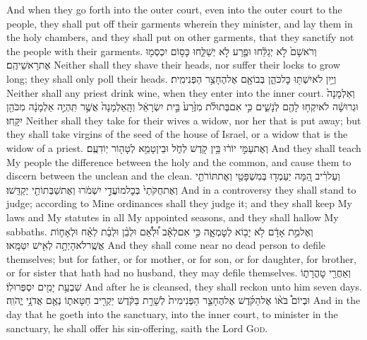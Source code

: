 {And when they go forth into the outer court, even into the outer court to the people, they shall put off their garments wherein they minister, and lay them in the holy chambers, and they shall put on other garments, that they sanctify not the people with their garments.}
{וְרֹאשָׁם֙ לֹ֣א יְגַלֵּ֔חוּ וּפֶ֖רַע לֹ֣א יְשַׁלֵּ֑חוּ כָּס֥וֹם יִכְסְמ֖וּ אֶת\maqqaf רָאשֵׁיהֶֽם׃}
{Neither shall they shave their heads, nor suffer their locks to grow long; they shall only poll their heads.}
{וְיַ֥יִן לֹא\maqqaf יִשְׁתּ֖וּ כׇּל\maqqaf כֹּהֵ֑ן בְּבוֹאָ֖ם אֶל\maqqaf הֶחָצֵ֥ר הַפְּנִימִֽית׃}
{Neither shall any priest drink wine, when they enter into the inner court.}
{וְאַלְמָנָה֙ וּגְרוּשָׁ֔ה לֹא\maqqaf יִקְח֥וּ לָהֶ֖ם לְנָשִׁ֑ים כִּ֣י אִם\maqqaf בְּתוּלֹ֗ת מִזֶּ֙רַע֙ בֵּ֣ית יִשְׂרָאֵ֔ל וְהָֽאַלְמָנָה֙ אֲשֶׁ֣ר תִּֽהְיֶ֣ה אַלְמָנָ֔ה מִכֹּהֵ֖ן יִקָּֽחוּ׃}
{Neither shall they take for their wives a widow, nor her that is put away; but they shall take virgins of the seed of the house of Israel, or a widow that is the widow of a priest.}
{וְאֶת\maqqaf עַמִּ֣י יוֹר֔וּ בֵּ֥ין קֹ֖דֶשׁ לְחֹ֑ל וּבֵין\maqqaf טָמֵ֥א לְטָה֖וֹר יֽוֹדִעֻֽם׃}
{And they shall teach My people the difference between the holy and the common, and cause them to discern between the unclean and the clean.}
{וְעַל\maqqaf רִ֗יב הֵ֚מָּה יַעַמְד֣וּ  בְּמִשְׁפָּטַ֖י  וְאֶת\maqqaf תּוֹרֹתַ֤י וְאֶת\maqqaf חֻקֹּתַי֙ בְּכׇל\maqqaf מוֹעֲדַ֣י יִשְׁמֹ֔רוּ וְאֶת\maqqaf שַׁבְּתוֹתַ֖י יְקַדֵּֽשׁוּ׃}
{And in a controversy they shall stand to judge; according to Mine ordinances shall they judge it; and they shall keep My laws and My statutes in all My appointed seasons, and they shall hallow My sabbaths.}
{וְאֶל\maqqaf מֵ֣ת אָדָ֔ם לֹ֥א יָב֖וֹא לְטׇמְאָ֑ה כִּ֣י אִם\maqqaf לְאָ֡ב וּ֠לְאֵ֠ם וּלְבֵ֨ן וּלְבַ֜ת לְאָ֗ח וּלְאָח֛וֹת אֲשֶֽׁר\maqqaf לֹא\maqqaf הָיְתָ֥ה לְאִ֖ישׁ יִטַּמָּֽאוּ׃}
{And they shall come near no dead person to defile themselves; but for father, or for mother, or for son, or for daughter, for brother, or for sister that hath had no husband, they may defile themselves.}
{וְאַחֲרֵ֖י טׇהֳרָת֑וֹ שִׁבְעַ֥ת יָמִ֖ים יִסְפְּרוּ\maqqaf לֽוֹ׃}
{And after he is cleansed, they shall reckon unto him seven days.}
{וּבְיוֹם֩ בֹּא֨וֹ אֶל\maqqaf הַקֹּ֜דֶשׁ אֶל\maqqaf הֶחָצֵ֤ר הַפְּנִימִית֙ לְשָׁרֵ֣ת בַּקֹּ֔דֶשׁ יַקְרִ֖יב חַטָּאת֑וֹ נְאֻ֖ם אֲדֹנָ֥י יֱהֹוִֽה׃}
{And in the day that he goeth into the sanctuary, into the inner court, to minister in the sanctuary, he shall offer his sin-offering, saith the Lord \textsc{God}.}
